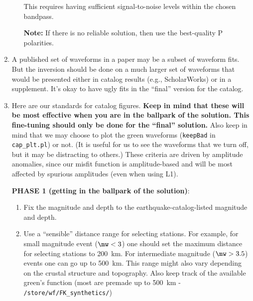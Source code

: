 \begin{enumerate}
\begin{enumerate}
This requires having sufficient signal-to-noise levels within the chosen bandpass.

{\bf Note:} If there is no reliable solution, then use the best-quality P polarities.

\end{enumerate}

\item A published set of waveforms in a paper may be a subset of waveform fits. But the inversion should be done on a much larger set of waveforms that would be presented either in catalog results (e.g., ScholarWorks) or in a supplement. It's okay to have ugly fits in the ``final'' version for the catalog.


\item Here are our standards for catalog figures. {\bf Keep in mind that these will be most effective when you are in the ballpark of the solution. This fine-tuning should only be done for the ``final'' solution.} Also keep in mind that we may choose to plot the green waveforms (\verb+keepBad+ in \verb+cap_plt.pl+) or not. (It is useful for us to see the waveforms that we turn off, but it may be distracting to others.) These criteria are driven by amplitude anomalies, since our misfit function is amplitude-based and will be most affected by spurious amplitudes (even when using L1).

\medskip\noindent
{\bf PHASE 1 (getting in the ballpark of the solution)}:
%
\begin{enumerate}
\item Fix the magnitude and depth to the earthquake-catalog-listed magnitude and depth.

\item Use a ``sensible'' distance range for selecting stations. For example, for small magnitude event ($\mw < 3$) one should set the maximum distance for selecting stations to 200~km. For intermediate magnitude ($\mw > 3.5$) events one can go up to 500~km. This range might also vary depending on the crustal structure and topography. Also keep track of the available green's function (most are premade up to 500~km - \verb+/store/wf/FK_synthetics/+)


\end{enumerate}
\end{enumerate}
